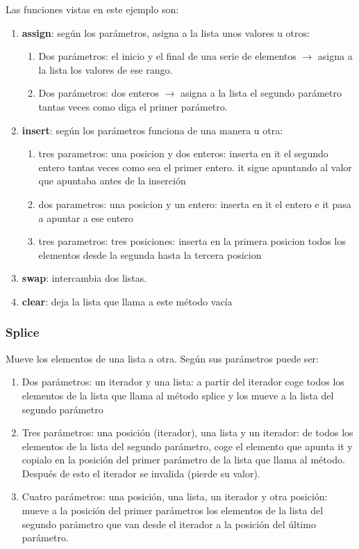 \documentclass[10pt,a4paper,spanish]{report}
\begin{document}
\noindent
Las funciones vistas en este ejemplo son:
\begin{enumerate}[$\spadesuit$]
\item \textbf{\textcolor[rgb]{0.2,0.5,0.5}{assign}}: según los parámetros, asigna a la lista unos valores u otros:
\begin{enumerate}[---]
\item Dos parámetros: el inicio y el final de una serie de elementos $\rightarrow$ asigna a la lista los valores de ese rango.
\item Dos parámetros: dos enteros $\rightarrow$ asigna a la lista el segundo parámetro tantas veces como diga el primer parámetro.
\end{enumerate}
\item \textbf{\textcolor[rgb]{0.2,0.5,0.5}{insert}}: según los parámetros funciona de una manera u otra:
\begin{enumerate}[---]
\item tres parametros: una posicion y dos enteros: inserta en it el segundo entero tantas veces como sea el primer entero. it sigue apuntando al valor que apuntaba antes de la inserción
\item dos parametros: una posicion y un entero: inserta en it el entero e it pasa a apuntar a ese entero
\item tres parametros: tres posiciones: inserta en la primera posicion todos los elementos desde la segunda hasta la tercera posicion
\end{enumerate}
\item \textbf{\textcolor[rgb]{0.2,0.5,0.5}{swap}}: intercambia dos listas.
\item \textbf{\textcolor[rgb]{0.2,0.5,0.5}{clear}}: deja la lista que llama a este método vacía
\end{enumerate}

\subsubsection{\textcolor[rgb]{0.2,0.5,0.5}Splice}
\noindent
Mueve los elementos de una lista a otra. Según sus parámetros puede ser:
\begin{enumerate}[---]
\item Dos parámetros: un iterador y una lista: a partir del iterador coge todos los elementos de la lista que llama al método splice y los mueve a la lista del segundo parámetro
\item Tres parámetros: una posición (iterador), una lista y un iterador: de todos los elementos de la lista del segundo parámetro, coge el elemento que apunta it y copialo en la posición del primer parámetro de la lista que llama al método. Después de esto el iterador se invalida (pierde su valor).
\item Cuatro parámetros: una posición, una lista, un iterador y otra posición: mueve a la posición del primer parámetros los elementos de la lista del segundo parámetro que van desde el iterador a la posición del último parámetro.
\end{enumerate}
\end{document}
